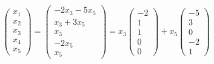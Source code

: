 \begin{example}
    \begin{align*}
        \begin{pmatrix}
            x_1 \\ x_2 \\ x_3 \\ x_4 \\ x_5
        \end{pmatrix}
        =
        \begin{pmatrix}
            -2x_3 - 5x_5 \\
            x_3 + 3x_5 \\
            x_3 \\
            -2x_5 \\
            x_5
        \end{pmatrix}
        =
        x_3
        \begin{pmatrix}
            -2 \\ 1 \\ 1 \\ 0 \\ 0
        \end{pmatrix}
        + x_5
        \begin{pmatrix}
            -5 \\ 3 \\ 0 \\ -2 \\ 1
        \end{pmatrix}
    \end{align*}
\end{example}

